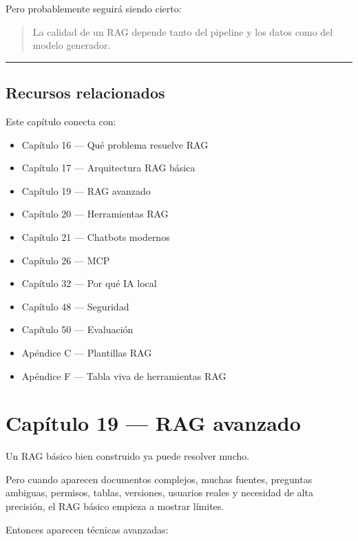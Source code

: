 Pero probablemente seguirá siendo cierto:

\begin{quote}
La calidad de un RAG depende tanto del pipeline y los datos como del
modelo generador.
\end{quote}

\begin{center}\rule{0.5\linewidth}{0.5pt}\end{center}

\section{Recursos relacionados}\label{recursos-relacionados-17}

Este capítulo conecta con:

\begin{itemize}
\tightlist
\item
  Capítulo 16 --- Qué problema resuelve RAG
\item
  Capítulo 17 --- Arquitectura RAG básica
\item
  Capítulo 19 --- RAG avanzado
\item
  Capítulo 20 --- Herramientas RAG
\item
  Capítulo 21 --- Chatbots modernos
\item
  Capítulo 26 --- MCP
\item
  Capítulo 32 --- Por qué IA local
\item
  Capítulo 48 --- Seguridad
\item
  Capítulo 50 --- Evaluación
\item
  Apéndice C --- Plantillas RAG
\item
  Apéndice F --- Tabla viva de herramientas RAG
\end{itemize}

\newpage

\chapter{Capítulo 19 --- RAG
avanzado}\label{capuxedtulo-19-rag-avanzado}

Un RAG básico bien construido ya puede resolver mucho.

Pero cuando aparecen documentos complejos, muchas fuentes, preguntas
ambiguas, permisos, tablas, versiones, usuarios reales y necesidad de
alta precisión, el RAG básico empieza a mostrar límites.

Entonces aparecen técnicas avanzadas:


